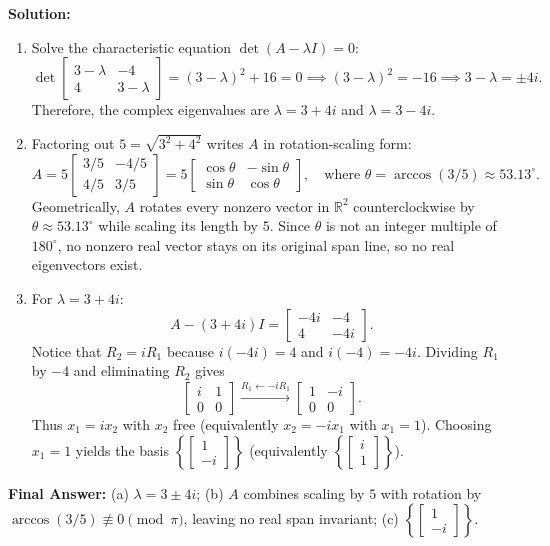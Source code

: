 \documentclass[11pt, letterpaper]{article}
\theoremstyle{definition}
\theoremstyle{remark}
\begin{document}
\textbf{Solution:}
\begin{enumerate}[label=(\alph*)]
    \item Solve the characteristic equation $\det(A - \lambda I) = 0$:
    \[
    \det \begin{bmatrix} 3 - \lambda & -4 \\ 4 & 3 - \lambda \end{bmatrix} = (3 - \lambda)^2 + 16 = 0 \implies (3 - \lambda)^2 = -16 \implies 3 - \lambda = \pm 4i.
    \]
    Therefore, the complex eigenvalues are $\lambda = 3 + 4i$ and $\lambda = 3 - 4i$.

    \item Factoring out $5 = \sqrt{3^2 + 4^2}$ writes $A$ in rotation-scaling form:
    \[
    A = 5 \begin{bmatrix} 3/5 & -4/5 \\ 4/5 & 3/5 \end{bmatrix} = 5 \begin{bmatrix} \cos\theta & -\sin\theta \\ \sin\theta & \cos\theta \end{bmatrix}, \quad \text{where } \theta = \arccos(3/5) \approx 53.13^\circ.
    \]
    Geometrically, $A$ rotates every nonzero vector in $\mathbb{R}^2$ counterclockwise by $\theta \approx 53.13^\circ$ while scaling its length by $5$. Since $\theta$ is not an integer multiple of $180^\circ$, no nonzero real vector stays on its original span line, so no real eigenvectors exist.

    \item For $\lambda = 3 + 4i$:
    \[
    A - (3 + 4i)I = \begin{bmatrix} -4i & -4 \\ 4 & -4i \end{bmatrix}.
    \]
    Notice that $R_2 = i R_1$ because $i(-4i) = 4$ and $i(-4) = -4i$. Dividing $R_1$ by $-4$ and eliminating $R_2$ gives
    \[
    \begin{bmatrix} i & 1 \\ 0 & 0 \end{bmatrix} \xrightarrow{R_1 \leftarrow -i R_1} \begin{bmatrix} 1 & -i \\ 0 & 0 \end{bmatrix}.
    \]
    Thus $x_1 = i x_2$ with $x_2$ free (equivalently $x_2 = -i x_1$ with $x_1 = 1$). Choosing $x_1 = 1$ yields the basis $\left\{ \begin{bmatrix} 1 \\ -i \end{bmatrix} \right\}$ (equivalently $\left\{ \begin{bmatrix} i \\ 1 \end{bmatrix} \right\}$).
\end{enumerate}
\textbf{Final Answer:} (a) $\lambda = 3 \pm 4i$; (b) $A$ combines scaling by $5$ with rotation by $\arccos(3/5) \not\equiv 0 \pmod{\pi}$, leaving no real span invariant; (c) $\left\{ \begin{bmatrix} 1 \\ -i \end{bmatrix} \right\}$.
\end{document}
